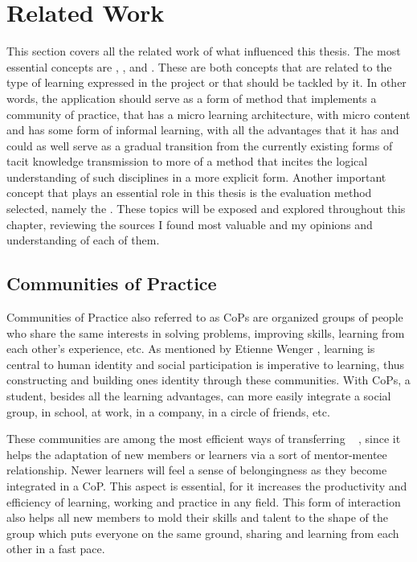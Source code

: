 \chapter{Related Work}
\label{cha:relatedwork}


This section covers all the related work of what influenced this thesis.
The most essential concepts are , , 
and . These are both concepts that are related to the type
of learning expressed in the project or that should be tackled by it. In other words,
the application should serve as a form of method that implements a community of practice, 
that has a micro learning architecture, with micro content and has some form of informal
learning, with all the advantages that it has and could as well serve as a gradual transition from the
currently existing forms of tacit knowledge transmission to more of a method that incites 
the logical understanding of such disciplines in a more explicit form.
Another important concept that plays an essential role
in this thesis is the evaluation method selected, namely the .
These topics will be exposed and explored throughout this chapter, 
reviewing the sources I found most valuable and my opinions and 
understanding of each of them.


\section{Communities of Practice}
\label{section:cops}

Communities of Practice also referred to as CoPs are organized groups of people 
who share the same interests in solving problems, improving skills, learning 
from each other's experience, etc. As mentioned by Etienne Wenger \cite{wenger_2002},
learning is central to human identity and social participation is imperative to
learning, thus constructing and building ones identity through these communities.
With CoPs, a student, besides all the learning advantages, can more easily integrate
a social group, in school, at work, in a company, in a circle of friends, etc.

These communities are among the most efficient ways of transferring 
~ \cite{goffin_koners_2011}, since it helps the 
adaptation of new members or learners via a sort of mentor-mentee relationship.
Newer learners will feel a sense of belongingness as they become integrated in 
a CoP. This aspect is essential, for it increases the productivity and efficiency 
of learning, working and practice in any field. This form of interaction also 
helps all new members to mold their skills and talent to the shape of the group which
puts everyone on the same ground, sharing and learning from each other in a fast
pace. ~\cite{wengercop}

